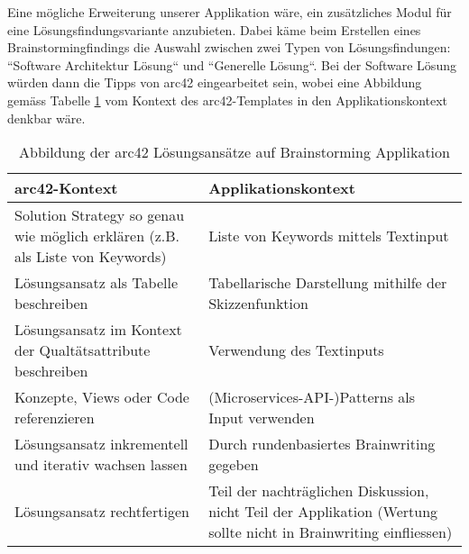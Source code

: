 Eine mögliche Erweiterung unserer Applikation wäre, ein zusätzliches Modul für eine Lösungsfindungsvariante anzubieten. Dabei käme beim Erstellen eines Brainstormingfindings die Auswahl zwischen zwei Typen von Lösungsfindungen: ``Software Architektur Lösung`` und ``Generelle Lösung``. Bei der Software Lösung würden dann die Tipps von arc42 eingearbeitet sein, wobei eine Abbildung gemäss Tabelle \ref{tab:arc42-mapping} vom Kontext des arc42-Templates in den Applikationskontext denkbar wäre.
\renewcommand{\arraystretch}{1.5}
\begin{table}
	\centering
	\begin{tabular}{|p{6cm}|p{6cm}|}
		\hline
		\textbf{arc42-Kontext} & \textbf{Applikationskontext}\\
		\hline
		Solution Strategy so genau wie möglich erklären (z.B. als Liste von Keywords) & Liste von Keywords mittels Textinput \\
		\hline
		Lösungsansatz als Tabelle beschreiben & Tabellarische Darstellung mithilfe der Skizzenfunktion\\
		\hline
		Lösungsansatz im Kontext der Qualtätsattribute beschreiben & Verwendung des Textinputs\\
		\hline
		Konzepte, Views oder Code referenzieren & (Microservices-API-)Patterns als Input verwenden\\
		\hline
		Lösungsansatz inkrementell und iterativ wachsen lassen & Durch rundenbasiertes Brainwriting gegeben\\
		\hline
		Lösungsansatz rechtfertigen & Teil der nachträglichen Diskussion, nicht Teil der Applikation (Wertung sollte nicht in Brainwriting einfliessen)\\
		\hline
	\end{tabular}
	\caption{Abbildung der arc42 Lösungsansätze auf Brainstorming Applikation}
	\label{tab:arc42-mapping}
\end{table}
